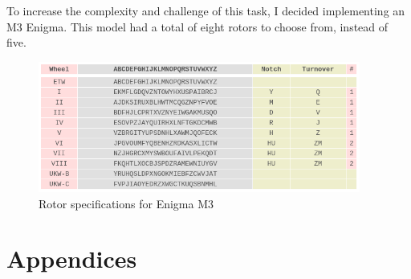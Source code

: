\documentclass{article}
\begin{document}
To increase the complexity and challenge of this task, I decided implementing an M3 Enigma. This model had a total of eight rotors to choose from, instead of five. 

\begin{figure}[H]
 \centering
  \includegraphics[width=300pt]{img/enigmaM3specs.png}
 \caption{Rotor specifications for Enigma M3}
 \end{figure}


\section{Appendices}
\end{document}
